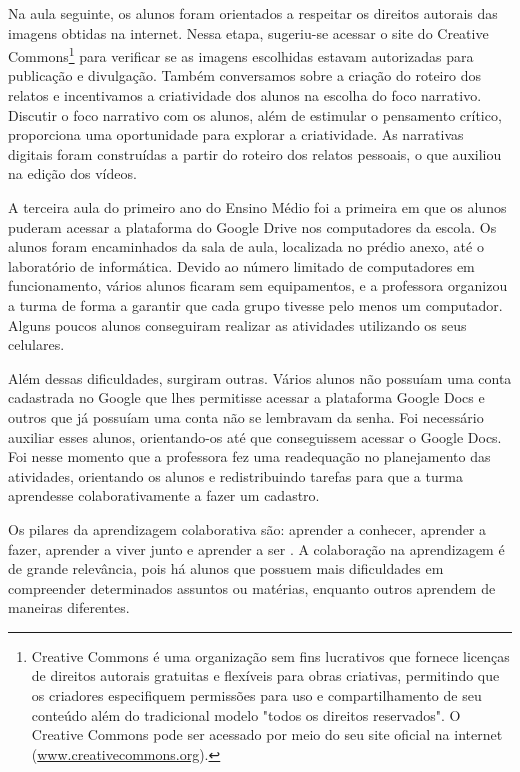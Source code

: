 \documentclass[portuguese]{textolivre}
\begin{document}
Na aula seguinte, os alunos foram orientados a respeitar os direitos autorais das imagens obtidas na internet. Nessa etapa, sugeriu-se acessar o site do Creative Commons\footnote{Creative Commons é uma organização sem fins lucrativos que fornece licenças de direitos autorais gratuitas e flexíveis para obras criativas, permitindo que os criadores especifiquem permissões para uso e compartilhamento de seu conteúdo além do tradicional modelo "todos os direitos reservados". O Creative Commons pode ser acessado por meio do seu site oficial na internet (\url{www.creativecommons.org}).} para verificar se as imagens escolhidas estavam autorizadas para publicação e divulgação. Também conversamos sobre a criação do roteiro dos relatos e incentivamos a criatividade dos alunos na escolha do foco narrativo. Discutir o foco narrativo com os alunos, além de estimular o pensamento crítico, proporciona uma oportunidade para explorar a criatividade. As narrativas digitais foram construídas a partir do roteiro dos relatos pessoais, o que auxiliou na edição dos vídeos.

A terceira aula do primeiro ano do Ensino Médio foi a primeira em que os alunos puderam acessar a plataforma do Google Drive nos computadores da escola. Os alunos foram encaminhados da sala de aula, localizada no prédio anexo, até o laboratório de informática. Devido ao número limitado de computadores em funcionamento, vários alunos ficaram sem equipamentos, e a professora organizou a turma de forma a garantir que cada grupo tivesse pelo menos um computador. Alguns poucos alunos conseguiram realizar as atividades utilizando os seus celulares.

Além dessas dificuldades, surgiram outras. Vários alunos não possuíam uma conta cadastrada no Google que lhes permitisse acessar a plataforma Google Docs e outros que já possuíam uma conta não se lembravam da senha. Foi necessário auxiliar esses alunos, orientando-os até que conseguissem acessar o Google Docs. Foi nesse momento que a professora fez uma readequação no planejamento das atividades, orientando os alunos e redistribuindo tarefas para que a turma aprendesse colaborativamente a fazer um cadastro.

Os pilares da aprendizagem colaborativa são: aprender a conhecer, aprender a fazer, aprender a viver junto e aprender a ser \cite{behrens2013}. A colaboração na aprendizagem é de grande relevância, pois há alunos que possuem mais dificuldades em compreender determinados assuntos ou matérias, enquanto outros aprendem de maneiras diferentes.
\end{document}
